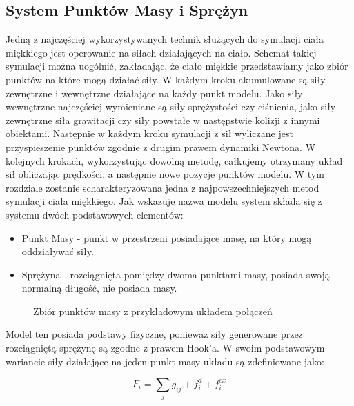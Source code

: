 \subsection{System Punktów Masy i Sprężyn}

Jedną z najczęściej wykorzystywanych technik służących do symulacji ciała miękkiego jest operowanie na siłach działających na ciało. Schemat takiej symulacji można uogólnić, zakładając, że ciało miękkie przedstawiamy jako zbiór punktów na które mogą działać siły. W każdym kroku akumulowane są siły zewnętrzne i wewnętrzne działające na każdy punkt modelu. Jako siły wewnętrzne najczęściej wymieniane są siły sprężystości czy ciśnienia, jako siły zewnętrzne siła grawitacji czy siły powstałe w następstwie kolizji z innymi obiektami. Następnie w każdym kroku symulacji z sił wyliczane jest przyspieszenie punktów zgodnie z drugim prawem dynamiki Newtona. W kolejnych krokach, wykorzystując dowolną metodę, całkujemy otrzymany układ sił obliczając prędkości, a następnie nowe pozycje punktów modelu.\cite{pbdyn}
W tym rozdziale zostanie scharakteryzowana jedna z najpowszechniejszych metod symulacji ciała miękkiego. Jak wskazuje nazwa modelu system składa się z systemu  dwóch podstawowych elementów:
\begin{itemize}
\item  Punkt Masy - punkt w przestrzeni posiadające masę, na który mogą oddziaływać siły.
\item Sprężyna - rozciągnięta pomiędzy dwoma punktami masy, posiada swoją normalną długość, nie posiada masy.

\end{itemize} 

\begin{figure}[ht]
\centering

\caption{Zbiór punktów masy z przykładowym układem połączeń}
\end{figure}
Model ten posiada podstawy fizyczne, ponieważ siły generowane przez rozciągniętą sprężynę są zgodne z prawem Hook'a. W swoim podstawowym wariancie siły działające na jeden punkt masy układu są zdefiniowane jako:

%
%
\begin{equation}
F_{i} = \sum_{j} g_{ij} + f^{d}_i + f^{ex}_{i}
\end{equation}

